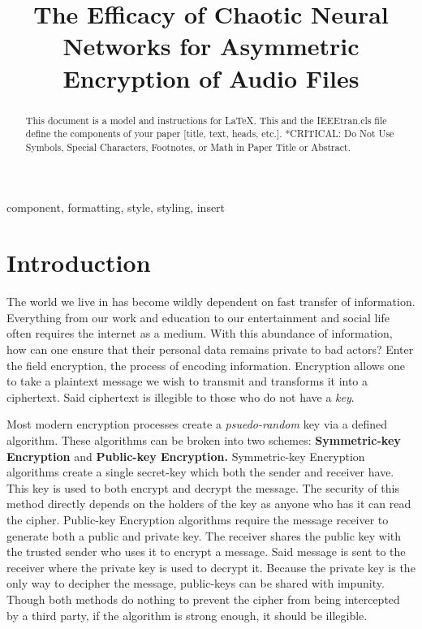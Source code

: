 \documentclass[conference]{IEEEtran}
\begin{document}
\title{The Efficacy of Chaotic Neural Networks for Asymmetric Encryption of Audio Files}

\author{
}

\maketitle

\begin{abstract}
This document is a model and instructions for \LaTeX.
This and the IEEEtran.cls file define the components of your paper [title, text, heads, etc.]. *CRITICAL: Do Not Use Symbols, Special Characters, Footnotes,
or Math in Paper Title or Abstract.
\end{abstract}

\begin{IEEEkeywords}
component, formatting, style, styling, insert
\end{IEEEkeywords}

\section{Introduction}\label{sec:introduction}

The world we live in has become wildly dependent on fast transfer of information.
Everything from our work and education to our entertainment and social life often requires the internet as a medium.
With this abundance of information, how can one ensure that their personal data remains private to bad actors?
Enter the field encryption, the process of encoding information.
Encryption allows one to take a plaintext message we wish to transmit and transforms it into a ciphertext.
Said ciphertext is illegible to those who do not have a \textit{key}.

Most modern encryption processes create a \textit{psuedo-random} key via a defined algorithm.
These algorithms can be broken into two schemes: \textbf{Symmetric-key Encryption} and \textbf{Public-key Encryption.}
Symmetric-key Encryption algorithms create a single secret-key which both the sender and receiver have.
This key is used to both encrypt and decrypt the message.
The security of this method directly depends on the holders of the key as anyone who has it can read the cipher.
Public-key Encryption algorithms require the message receiver to generate both a public and private key.
The receiver shares the public key with the trusted sender who uses it to encrypt a message.
Said message is sent to the receiver where the private key is used to decrypt it.
Because the private key is the only way to decipher the message, public-keys can be shared with impunity.
Though both methods do nothing to prevent the cipher from being intercepted by a third party, if the algorithm is strong enough, it should be illegible.
\end{document}
